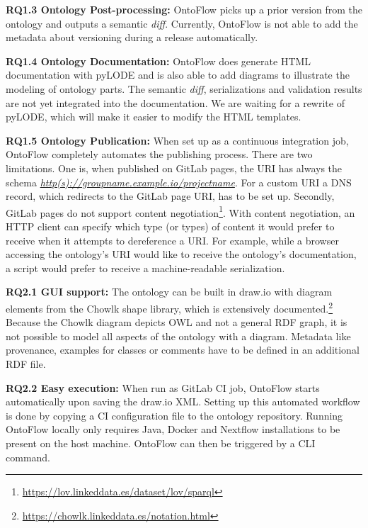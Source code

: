 \documentclass[runningheads]{llncs}
\begin{document}
\noindent\textbf{RQ1.3 Ontology Post-processing:} OntoFlow picks up a prior version from the ontology and outputs a semantic \textit{diff}. Currently, OntoFlow is not able to add the metadata about versioning during a release automatically.

\noindent\textbf{RQ1.4 Ontology Documentation:} OntoFlow does generate HTML documentation with pyLODE and is also able to add diagrams to illustrate the modeling of ontology parts. The semantic \textit{diff}, serializations and validation results are not yet integrated into the documentation. We are waiting for a rewrite of pyLODE, which will make it easier to modify the HTML templates.

\noindent\textbf{RQ1.5 Ontology Publication:} When set up as a continuous integration job, OntoFlow completely automates the publishing process. There are two limitations. One is, when published on GitLab pages, the URI has always the schema \textit{\url{http(s)://groupname.example.io/projectname}}. For a custom URI a DNS record, which redirects to the GitLab page URI, has to be set up. Secondly, GitLab pages do not support content negotiation\footnote{\url{https://lov.linkeddata.es/dataset/lov/sparql}}. With content negotiation, an HTTP client can specify which type (or types) of content it would prefer to receive when it attempts to dereference a URI. For example, while a browser accessing the ontology's URI would like to receive the ontology's documentation, a script would prefer to receive a machine-readable serialization.

\noindent\textbf{RQ2.1 GUI support:} The ontology can be built in draw.io with diagram elements from the Chowlk shape library, which is extensively documented.\footnote{\url{https://chowlk.linkeddata.es/notation.html}} Because the Chowlk diagram depicts OWL and not a general RDF graph, it is not possible to model all aspects of the ontology with a diagram. Metadata like provenance, examples for classes or comments have to be defined in an additional RDF file.

\noindent\textbf{RQ2.2 Easy execution:} When run as GitLab CI job, OntoFlow starts automatically upon saving the draw.io XML. Setting up this automated workflow is done by copying a CI configuration file to the ontology repository. Running OntoFlow locally only requires Java, Docker and Nextflow installations to be present on the host machine. OntoFlow can then be triggered by a CLI command.
\end{document}
